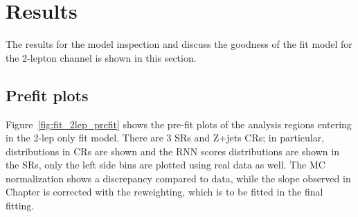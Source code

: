 \chapter{Results}

The results for the model inspection and discuss the goodness of the fit model for the 2-lepton channel is shown in this section.

\section{Prefit plots}
Figure~\ref{fig:fit_2lep_prefit} shows the pre-fit plots of the analysis regions entering in the 2-lep only fit model. There are 3 SRs and Z+jets CRs;
in particular, \mjjtag distributions in \Zjets CRs are shown and the RNN scores distributions are shown in the SRs, only the left side bins are plotted using real data as well. The MC normalization shows a discrepancy compared to data, while the slope observed in Chapter is corrected with the reweighting, which is to be fitted in the final fitting.

